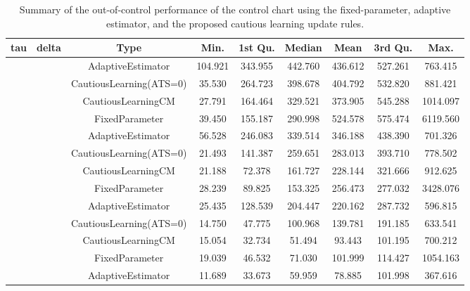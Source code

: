 \begin{table}[!h]

\caption{Summary of the out-of-control performance of the control chart using the fixed-parameter, adaptive estimator, and the proposed cautious learning update rules.}
\centering
\begin{tabular}[t]{ccccccccc}
\toprule
tau & delta & Type & Min. & 1st Qu. & Median & Mean & 3rd Qu. & Max.\\
\midrule
 &  & AdaptiveEstimator & 104.921 & 343.955 & 442.760 & 436.612 & 527.261 & 763.415\\

 &  & CautiousLearning(ATS=0) & 35.530 & 264.723 & 398.678 & 404.792 & 532.820 & 881.421\\

 &  & CautiousLearningCM & 27.791 & 164.464 & 329.521 & 373.905 & 545.288 & 1014.097\\

 & \multirow[t]{-4}{*}{\centering\arraybackslash 0.25} & FixedParameter & 39.450 & 155.187 & 290.998 & 524.578 & 575.474 & 6119.560\\
\cmidrule{2-9}
 &  & AdaptiveEstimator & 56.528 & 246.083 & 339.514 & 346.188 & 438.390 & 701.326\\

 &  & CautiousLearning(ATS=0) & 21.493 & 141.387 & 259.651 & 283.013 & 393.710 & 778.502\\

 &  & CautiousLearningCM & 21.188 & 72.378 & 161.727 & 228.144 & 321.666 & 912.625\\

 & \multirow[t]{-4}{*}{\centering\arraybackslash 0.35} & FixedParameter & 28.239 & 89.825 & 153.325 & 256.473 & 277.032 & 3428.076\\
\cmidrule{2-9}
 &  & AdaptiveEstimator & 25.435 & 128.539 & 204.447 & 220.162 & 287.732 & 596.815\\

 &  & CautiousLearning(ATS=0) & 14.750 & 47.775 & 100.968 & 139.781 & 191.185 & 633.541\\

 &  & CautiousLearningCM & 15.054 & 32.734 & 51.494 & 93.443 & 101.195 & 700.212\\

 & \multirow[t]{-4}{*}{\centering\arraybackslash 0.50} & FixedParameter & 19.039 & 46.532 & 71.030 & 101.999 & 114.427 & 1054.163\\
\cmidrule{2-9}
 &  & AdaptiveEstimator & 11.689 & 33.673 & 59.959 & 78.885 & 101.998 & 367.616\\


\end{tabular}
\end{table}
